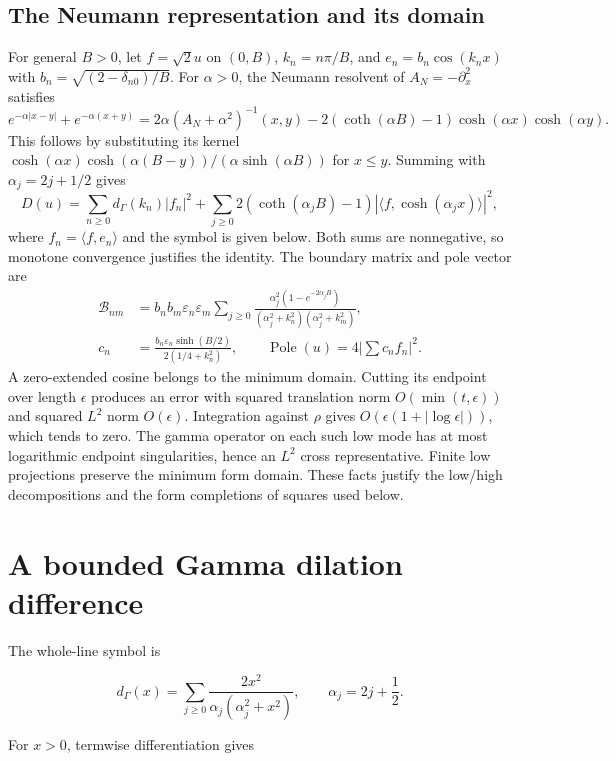 \documentclass[11pt]{article}
\begin{document}
\subsection{The Neumann representation and its domain}
For general $B>0$, let $f=\sqrt2u$ on $(0,B)$,
$k_n=n\pi/B$, and $e_n=b_n\cos(k_nx)$ with
$b_n=\sqrt{(2-\delta_{n0})/B}$. For $\alpha>0$, the Neumann resolvent
of $A_N=-\partial_x^2$ satisfies
\[
 e^{-\alpha|x-y|}+e^{-\alpha(x+y)}
 =2\alpha(A_N+\alpha^2)^{-1}(x,y)
 -2(\coth(\alpha B)-1)\cosh(\alpha x)\cosh(\alpha y).
\]
This follows by substituting its kernel
$\cosh(\alpha x)\cosh(\alpha(B-y))/(\alpha\sinh(\alpha B))$ for
$x\le y$. Summing with $\alpha_j=2j+1/2$ gives
\begin{equation}\label{eq:neumann}
 D(u)=\sum_{n\ge0}d_\Gamma(k_n)|f_n|^2+
 \sum_{j\ge0}2(\coth(\alpha_jB)-1)
       |\langle f,\cosh(\alpha_jx)\rangle|^2,
\end{equation}
where $f_n=\langle f,e_n\rangle$ and the symbol is given below.
Both sums are nonnegative, so monotone convergence justifies the identity.
The boundary matrix and pole vector are
\begin{align}
 \mathcal B_{nm}&=b_nb_m\varepsilon_n\varepsilon_m
 \sum_{j\ge0}\frac{\alpha_j^2(1-e^{-2\alpha_jB})}
 {(\alpha_j^2+k_n^2)(\alpha_j^2+k_m^2)},\nonumber\\
 c_n&=\frac{b_n\varepsilon_n\sinh(B/2)}{2(1/4+k_n^2)},
 \qquad\operatorname{Pole}(u)=4\left|\sum c_nf_n\right|^2.
 \label{eq:boundary-pole}
\end{align}
A zero-extended cosine belongs to the minimum domain. Cutting its endpoint
over length $\epsilon$ produces an error with squared translation norm
$O(\min(t,\epsilon))$ and squared $L^2$ norm $O(\epsilon)$.
Integration against $\rho$ gives
$O(\epsilon(1+|\log\epsilon|))$, which tends to zero. The gamma operator
on each such low mode has at most logarithmic endpoint singularities,
hence an $L^2$ cross representative. Finite low projections preserve the
minimum form domain. These facts justify the low/high decompositions
and the form completions of squares used below.
\section{A bounded Gamma dilation difference}

The whole-line symbol is

\[
d_\Gamma(x)=\sum_{j\ge0}
 \frac{2x^2}{\alpha_j(\alpha_j^2+x^2)},
\qquad \alpha_j=2j+\frac12.
\]

For \(x>0\), termwise differentiation gives
\end{document}
